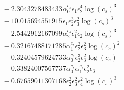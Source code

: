 \documentclass[10pt]{article}
\begin{document}
\begin{align*}
&{}  - 2.3043278483433 \alpha_{0}^{c_s} \epsilon_{1} \epsilon_{2}^{4} \log{\left(c_{s} \right)}^{3} \\
&{}  - 10.015694551915 \epsilon_{1} \epsilon_{2}^{3} \epsilon_{3}^{2} \log{\left(c_{s} \right)}^{3} \\
&{}  - 2.5442912167099 \alpha_{2}^{c_s} \epsilon_{1}^{2} \epsilon_{2} \log{\left(c_{s} \right)}^{3} \\
&{}  - 0.32167488171285 \alpha_{1}^{c_s} \epsilon_{2}^{2} \epsilon_{3}^{2} \log{\left(c_{s} \right)}^{2} \\
&{}  - 0.32404579624733 \alpha_{0}^{c_s} \epsilon_{2}^{3} \epsilon_{3}^{2} \log{\left(c_{s} \right)} \\
&{}  - 0.33824007567737 \alpha_{0}^{c_s} \alpha_{1}^{c_s} \epsilon_{2}^{2} \epsilon_{3} \\
&{}  - 0.67659011307168 \epsilon_{2}^{2} \epsilon_{3}^{2} \epsilon_{4}^{2} \log{\left(c_{s} \right)}^{3}
\end{align*}
\end{document}
